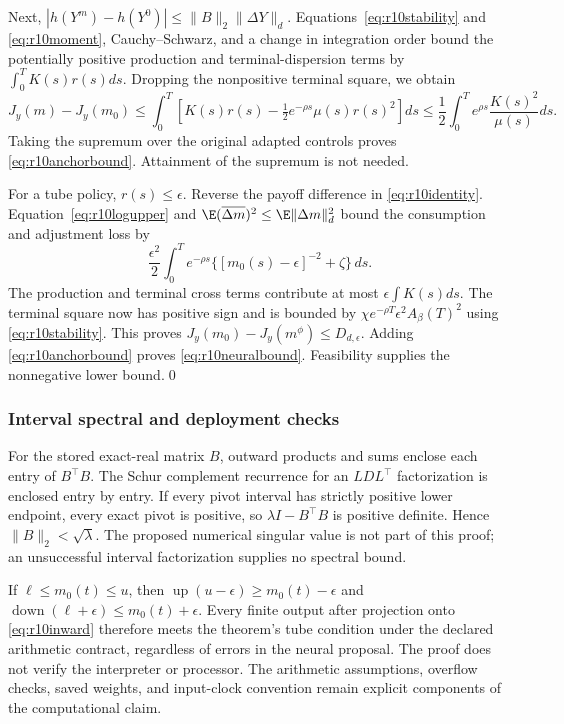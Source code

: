 Next, $|h(Y^m)-h(Y^0)|\leq\|B\|_2\|\Delta Y\|_d$. Equations~\eqref{eq:r10stability} and \eqref{eq:r10moment}, Cauchy--Schwarz, and a change in integration order bound the potentially positive production and terminal-dispersion terms by $\int_0^T K(s)r(s)ds$. Dropping the nonpositive terminal square, we obtain
\[
 J_y(m)-J_y(m_0)
 \leq\int_0^T\left[K(s)r(s)
             -\tfrac12e^{-\rho s}\mu(s)r(s)^2\right]ds
 \leq\frac12\int_0^T e^{\rho s}\frac{K(s)^2}{\mu(s)}ds.
\]
Taking the supremum over the original adapted controls proves \eqref{eq:r10anchorbound}. Attainment of the supremum is not needed.

For a tube policy, $r(s)\leq\epsilon$. Reverse the payoff difference in \eqref{eq:r10identity}. Equation~\eqref{eq:r10logupper} and
$\E(\overline{\Delta m})^2\leq\E\|\Delta m\|_d^2$
bound the consumption and adjustment loss by
\[
 \frac{\epsilon^2}{2}\int_0^T e^{-\rho s}
       \{[m_0(s)-\epsilon]^{-2}+\zeta\}\,ds.
\]
The production and terminal cross terms contribute at most $\epsilon\int K(s)ds$. The terminal square now has positive sign and is bounded by
$\chi e^{-\rho T}\epsilon^2 A_\beta(T)^2$ using \eqref{eq:r10stability}. This proves $J_y(m_0)-J_y(m^\phi)\leq D_{d,\epsilon}$. Adding \eqref{eq:r10anchorbound} proves \eqref{eq:r10neuralbound}. Feasibility supplies the nonnegative lower bound.\qed

\subsubsection{Interval spectral and deployment checks}
For the stored exact-real matrix $B$, outward products and sums enclose each entry of $B^\top B$. The Schur complement recurrence for an $LDL^\top$ factorization is enclosed entry by entry. If every pivot interval has strictly positive lower endpoint, every exact pivot is positive, so $\lambda I-B^\top B$ is positive definite. Hence $\|B\|_2<\sqrt\lambda$. The proposed numerical singular value is not part of this proof; an unsuccessful interval factorization supplies no spectral bound.

If $\ell\leq m_0(t)\leq u$, then
$\operatorname{up}(u-\epsilon)\geq m_0(t)-\epsilon$ and
$\operatorname{down}(\ell+\epsilon)\leq m_0(t)+\epsilon$.
Every finite output after projection onto \eqref{eq:r10inward} therefore meets the theorem's tube condition under the declared arithmetic contract, regardless of errors in the neural proposal. The proof does not verify the interpreter or processor. The arithmetic assumptions, overflow checks, saved weights, and input-clock convention remain explicit components of the computational claim.
